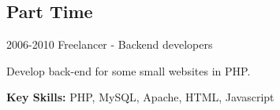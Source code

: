 \documentclass[]{friggeri-cv} %
\begin{document}
\begin{entrylist}



\end{entrylist}

\subsection{Part Time}

\begin{entrylist}

\entry
{2006-2010}
{Freelancer - Backend developers}
{}
{
Develop back-end for some small websites in PHP.  

\textbf{Key Skills: }
PHP, MySQL, Apache, HTML, Javascript
}

\end{entrylist}

%
\end{document}

